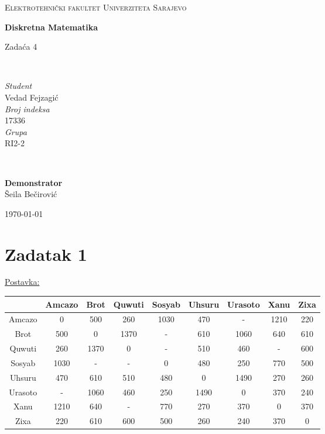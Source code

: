 \documentclass[12pt]{article}
\begin{document}
\begin{titlepage}
	\newcommand{\HRule}{\rule{\linewidth}{0.5mm}}
	
	\center
	
	\textsc{\Large Elektrotehnički fakultet Univerziteta Sarajevo}\\[4cm]
	
	{\huge\bfseries Diskretna Matematika\vspace{5mm}

 	Zadaća 4}\\[4.5cm]

	\begin{minipage}{0.4\textwidth}
		\begin{flushleft}
			\large
			\textit{Student}\\
			Vedad Fejzagić\\[5mm]
			\textit{Broj indeksa}\\
			17336\\[5mm]
			\textit{Grupa}\\
			RI2-2
		\end{flushleft}
	\end{minipage}
	~
	\begin{minipage}{0.4\textwidth}
		\begin{flushright}
			\large
			\textbf{Demonstrator}\\
			\hspace{10mm}Šeila Bečirović
		\end{flushright}
	\end{minipage}
	
	\vfill\vfill\vfill
	
	{\large\today}
	
	\vfill
	
\end{titlepage}


\newpage
\section*{Zadatak 1\label{Z1}}

\underline{Postavka:}

\begin{tabular}{ | c || c  | c | c | c | c | c | c | c | }
\hline
 & Amcazo & Brot & Quwuti & Sosyab & Uhsuru & Urasoto & Xanu & Zixa\\
 \hline
 \hline
Amcazo & 0 & 500 & 260 & 1030 & 470 & - & 1210 & 220\\
 \hline
Brot & 500 & 0 & 1370 & - & 610 & 1060 & 640 & 610\\
 \hline
Quwuti & 260 & 1370 & 0 & - & 510 & 460 & - & 600\\
 \hline
Sosyab & 1030 & - & - & 0 & 480 & 250 & 770 & 500\\
 \hline
Uhsuru & 470 & 610 & 510 & 480 & 0 & 1490 & 270 & 260\\
 \hline
Urasoto & - & 1060 & 460 & 250 & 1490 & 0 & 370 & 240\\
 \hline
Xanu & 1210 & 640 & - & 770 & 270 & 370 & 0 & 370\\
 \hline
Zixa & 220 & 610 & 600 & 500 & 260 & 240 & 370 & 0\\
 \hline
\end{tabular}
\end{document}
